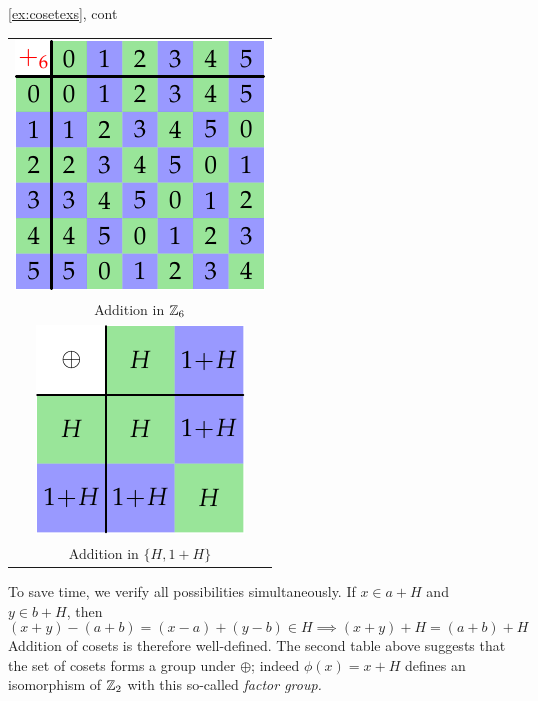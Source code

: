 \begin{examples*}{\ref{ex:cosetexs}, cont}{}
\begin{enumerate}
\begin{minipage}[t]{0.25\linewidth}
			\hfill
			\begin{tabular}{@{}c@{}}
				\includegraphics[scale=0.9]{factor-z6}\\
				Addition in $\mathbb{Z}_6$\\[5pt]
				\includegraphics[scale=0.9]{factor-z6-2}\\
				Addition in $\{H,1+H\}$
			\end{tabular}
		\end{minipage}\smallbreak
		To save time, we verify all possibilities simultaneously. If $x\in a+H$ and $y\in b+H$, then
		\[
			(x+y)-(a+b)=(x-a)+(y-b)\in H\implies (x+y)+H=(a+b)+H
		\]
		Addition of cosets is therefore well-defined. The second table above suggests that the set of cosets forms a group under $\oplus$; indeed $\phi(x)=x+H$ defines an isomorphism of $\mathbb{Z}_2$ with this so-called \emph{factor group.}
	

\end{enumerate}
\end{examples*}
